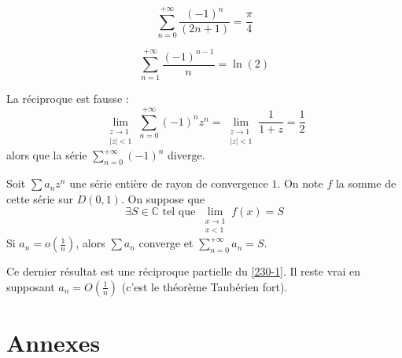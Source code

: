   \begin{application}
    \[ \sum_{n=0}^{+\infty} \frac{(-1)^n}{(2n+1)} = \frac{\pi}{4} \]
  \end{application}

  \begin{application}
    \[ \sum_{n=1}^{+\infty} \frac{(-1)^{n-1}}{n} = \ln(2) \]
  \end{application}

  \begin{cexample}
    La réciproque est fausse :
    \[ \lim_{\substack{z \rightarrow 1 \\ \vert z \vert < 1}} \sum_{n=0}^{+\infty} (-1)^n z^n = \lim_{\substack{z \rightarrow 1 \\ \vert z \vert < 1}} \frac{1}{1+z} = \frac{1}{2} \]
    alors que la série $\sum_{n=0}^{+\infty} (-1)^n$ diverge.
  \end{cexample}

  \begin{theorem}
    Soit $\sum a_n z^n$ une série entière de rayon de convergence $1$. On note $f$ la somme de cette série sur $D(0,1)$. On suppose que
    \[ \exists S \in \mathbb{C} \text{ tel que } \lim_{\substack{x \rightarrow 1 \\ x < 1}} f(x) = S \]
    Si $a_n = o \left( \frac{1}{n} \right)$, alors $\sum a_n$ converge et $\sum_{n=0}^{+\infty} a_n = S$.
  \end{theorem}

  \begin{remark}
    Ce dernier résultat est une réciproque partielle du \cref{230-1}. Il reste vrai en supposant $a_n = O \left( \frac{1}{n} \right)$ (c'est le théorème Taubérien fort).
  \end{remark}

  \newpage
  \section*{Annexes}


